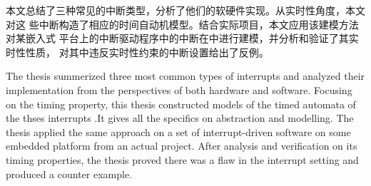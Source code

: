 
\makeatletter
\ifthu@bachelor\relax\else
  \ifthu@doctor
  \else
    \ifthu@master
    \fi
  \fi
\fi
\makeatother





\begin{cabstract}
   本文总结了三种常见的中断类型，分析了他们的软硬件实现。从实时性角度，本文对这
   些中断构造了相应的时间自动机模型。结合实际项目，本文应用该建模方法对某嵌入式
   平台上的中断驱动程序中的中断在\uppaal 中进行建模，并分析和验证了其实时性性质，
   对其中违反实时性约束的中断设置给出了反例。
\end{cabstract}


\begin{eabstract} 
   The thesis summerized three most common types of interrupts and analyzed
   their implementation from the perspectives of both hardware and software.
   Focusing on the timing property, this thesis constructed models of the 
   timed automata of the thses interrupts .It gives all the specifics on 
   abstraction and modelling. The thesis applied the same approach on a set 
   of interrupt-driven software on some embedded platform from an actual 
   project. After analysis and verification on its timing properties, the 
   thesis proved there was a flaw in the interrupt setting and produced a 
   counter example.
\end{eabstract}

